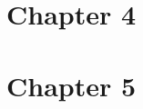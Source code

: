 \documentclass[scheme=plain]{ctexart}
\begin{document}
    \maketitle\tableofcontents\clearpage

    \section{Chapter 4}
        
    \section{Chapter 5}
        

    \printindex
\end{document}

